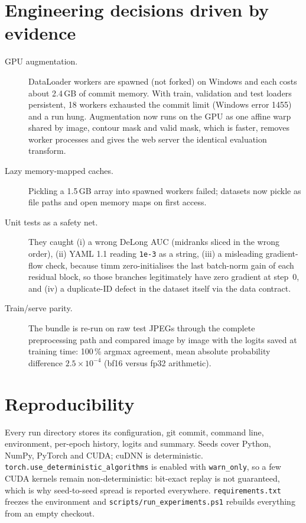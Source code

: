 \section{Engineering decisions driven by evidence}
\begin{description}
\item[GPU augmentation.] DataLoader workers are spawned (not forked) on Windows and each costs about 2.4\,GB of commit memory. With train, validation and test
loaders persistent, 18 workers exhausted the commit limit (Windows error 1455) and a run hung. Augmentation now runs on the GPU as one affine warp
shared by image, contour mask and valid mask, which is faster, removes worker processes and gives the web server the identical evaluation transform.
\item[Lazy memory-mapped caches.] Pickling a 1.5\,GB array into spawned workers failed; datasets now pickle as file paths and open memory maps on first access.
\item[Unit tests as a safety net.] They caught (i) a wrong DeLong AUC (midranks sliced in the wrong order), (ii) YAML 1.1 reading \texttt{1e-3} as a string,
(iii) a misleading gradient-flow check, because timm zero-initialises the last batch-norm gain of each residual block, so those branches legitimately have zero
gradient at step~0, and (iv) a duplicate-ID defect in the dataset itself via the data contract.
\item[Train/serve parity.] The bundle is re-run on raw test JPEGs through the complete preprocessing path and compared image by image with the logits saved at training
time: 100\,\% argmax agreement, mean absolute probability difference $2.5{\times}10^{-4}$ (bf16 versus fp32 arithmetic).
\end{description}

\section{Reproducibility}
Every run directory stores its configuration, git commit, command line, environment, per-epoch history, logits and summary. Seeds cover Python, NumPy,
PyTorch and CUDA; cuDNN is deterministic. \texttt{torch.use\_deterministic\_algorithms} is enabled with \texttt{warn\_only}, so a few CUDA kernels remain
non-deterministic: bit-exact replay is not guaranteed, which is why seed-to-seed spread is reported everywhere. \texttt{requirements.txt} freezes the
environment and \texttt{scripts/run\_experiments.ps1} rebuilds everything from an empty checkout.

